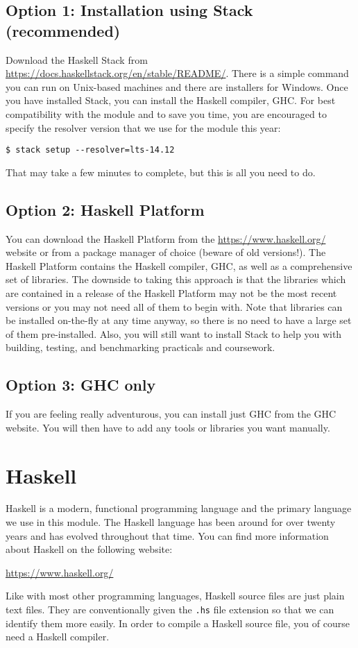 \subsection{Option 1: Installation using Stack (recommended)}

Download the Haskell Stack from {\small \url{https://docs.haskellstack.org/en/stable/README/}}. There is a simple command you can run on Unix-based machines and there are installers for Windows. Once you have installed Stack, you can install the Haskell compiler, GHC. For best compatibility with the module and to save you time, you are encouraged to specify the resolver version that we use for the module this year:
\begin{verbatim}
$ stack setup --resolver=lts-14.12
\end{verbatim}
That may take a few minutes to complete, but this is all you need to do.

\subsection{Option 2: Haskell Platform}

You can download the Haskell Platform from the {\small \url{https://www.haskell.org/}} website or from a package manager of choice (beware of old versions!). The Haskell Platform contains the Haskell compiler, GHC, as well as a comprehensive set of libraries. The downside to taking this approach is that the libraries which are contained in a release of the Haskell Platform may not be the most recent versions or you may not need all of them to begin with. Note that libraries can be installed on-the-fly at any time anyway, so there is no need to have a large set of them pre-installed. Also, you will still want to install Stack to help you with building, testing, and benchmarking practicals and coursework.

\subsection{Option 3: GHC only}

If you are feeling really adventurous, you can install just GHC from the GHC website. You will then have to add any tools or libraries you want manually.

\section{Haskell}

Haskell is a modern, functional programming language and the primary language we use in this module. The Haskell language has been around for over twenty years and has evolved throughout that time. You can find more information about Haskell on the following website:
\begin{center}
	\url{https://www.haskell.org/}
\end{center}
Like with most other programming languages, Haskell source files are just plain text files. They are conventionally given the \texttt{\small .hs} file extension so that we can identify them more easily. In order to compile a Haskell source file, you of course need a Haskell compiler.

